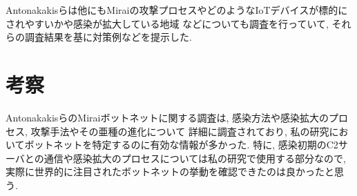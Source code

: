 \documentclass[twocolumn,9]{ltjsarticle}
\begin{document}
Antonakakisらは他にもMiraiの攻撃プロセスやどのようなIoTデバイスが標的にされやすいかや感染が拡大している地域
などについても調査を行っていて, それらの調査結果を基に対策例などを提示した. 

\section{考察}
AntonakakisらのMiraiボットネットに関する調査は, 感染方法や感染拡大のプロセス, 攻撃手法やその亜種の進化について
詳細に調査されており, 私の研究においてボットネットを特定するのに有効な情報が多かった. 
特に, 感染初期のC2サーバとの通信や感染拡大のプロセスについては私の研究で使用する部分なので, 
実際に世界的に注目されたボットネットの挙動を確認できたのは良かったと思う. 



\end{document}
